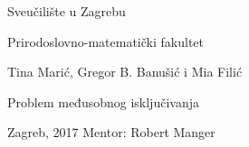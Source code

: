 \begin{center}
\thispagestyle{empty}
{\Large Sveučilište u Zagrebu}
\par\end{center}{\Large \par}

\begin{center}
{\Large Prirodoslovno-matematički fakultet}
\par\end{center}{\Large \par}

\smallskip{}

\vfill{}

\begin{center}
\Large Tina Marić, Gregor B. Banušić i Mia Filić
\par\end{center}{\Large \par}

\medskip{}


\begin{center}
\LARGE 
Problem međusobnog isključivanja
\par\end{center}{\huge \par}

\bigskip{}

\vfill{}
Zagreb, 2017 \hfill{} Mentor: Robert Manger
\newpage

\thispagestyle{empty}